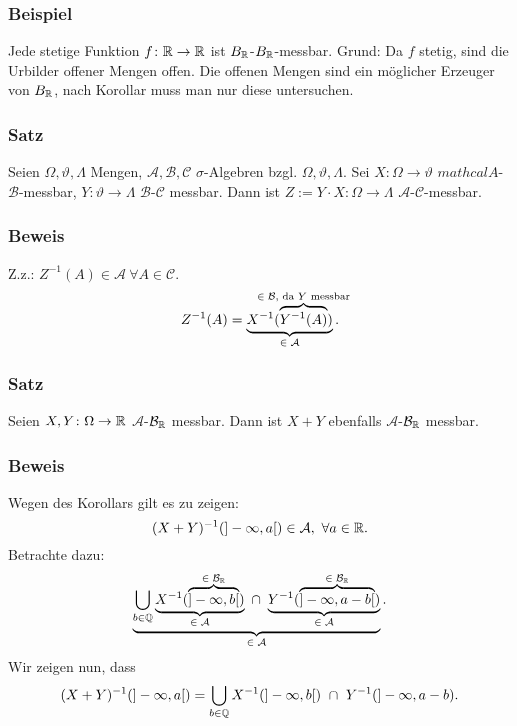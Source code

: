 \subsubsection{Beispiel}
Jede stetige Funktion $f\colon\mathbb{R}\to\mathbb{R}$ ist $B_{\mathbb{R}}$-$B_{\mathbb{R}}$-messbar. Grund: Da $f$ stetig, sind die Urbilder offener Mengen offen. Die offenen Mengen sind ein m\"oglicher Erzeuger von $B_{\mathbb{R}}$, nach Korollar muss man nur diese untersuchen.
\subsubsection{Satz}
Seien $\Omega,\vartheta,\Lambda$ Mengen, $\mathcal{A},\mathcal{B},\mathcal{C}$ $\sigma$-Algebren bzgl. $\Omega,\vartheta,\Lambda$. Sei $X\colon\Omega\to\vartheta$ $mathcal{A}$-$\mathcal{B}$-messbar, $Y\colon\vartheta\to\Lambda$ $\mathcal{B}$-$\mathcal{C}$ messbar. Dann ist $Z:=Y\cdot X\colon\Omega\to\Lambda$ $\mathcal{A}$-$\mathcal{C}$-messbar.
\subsubsection{Beweis}
Z.z.: $Z^{-1}(A)\in\mathcal{A}\ \forall A\in\mathcal{C}$.
\[Z^{-1}(A)=\ubr{X^{-1}(\obr{Y^{-1}(A)}{$\in\mathcal{B}$, da $Y$ messbar})}{$\in\mathcal{A}$}.\]
\subsubsection{Satz}
Seien $X,Y\colon\Omega\to\mathbb{R}$ $\mathcal{A}$-$\mathcal{B}_{\mathbb{R}}$ messbar. Dann ist $X+Y$ ebenfalls $\mathcal{A}$-$\mathcal{B}_{\mathbb{R}}$ messbar.
\subsubsection{Beweis}
Wegen des Korollars gilt es zu zeigen:
\[(X+Y)^{-1}(]-\infty,a[)\in\mathcal{A},\ \forall a\in\mathbb{R}.\]
Betrachte dazu:
\[\ubr{\bigcup_{b\in\QQ}\ubr{X^{-1}(\obr{]-\infty,b[}{$\in\mathcal{B}_\RR$})}{$\in\mathcal{A}$}\ \cap\ \ubr{Y^{-1}(\obr{]-\infty,a-b[}{$\in\mathcal{B}_\RR$})}{$\in\mathcal{A}$}}{$\in\mathcal{A}$}.\]
Wir zeigen nun, dass
\[(X+Y)^{-1}(]-\infty,a[)=\bigcup_{b\in\QQ}X^{-1}(]-\infty,b[)\ \cap\ Y^{-1}(]-\infty,a-b).\]
\bul{
\item ``$\subset$'': Sei $\omega\in(X+Y)^{-1}(]-\infty,a[)\LRA(X+Y)(\omega)<a$. Sei $b\in\QQ$ mit $b\in]X(\omega),X(\omega)+\mathcal{\varepsilon}{2}[$. $\RA X(\omega)<b$ und $Y(\omega)+b<X(\omega)+Y(\omega)+\frac{\varepsilon}{2}<a\RA Y(\omega)<a-b$.
\item ``$\supset$'': Sei $\omega\in\ldots\RA\exists b$, sodass $X(\omega)<b$ und $Y(\omega)<a-b\RA(X+Y)(\omega)<a$.
}
